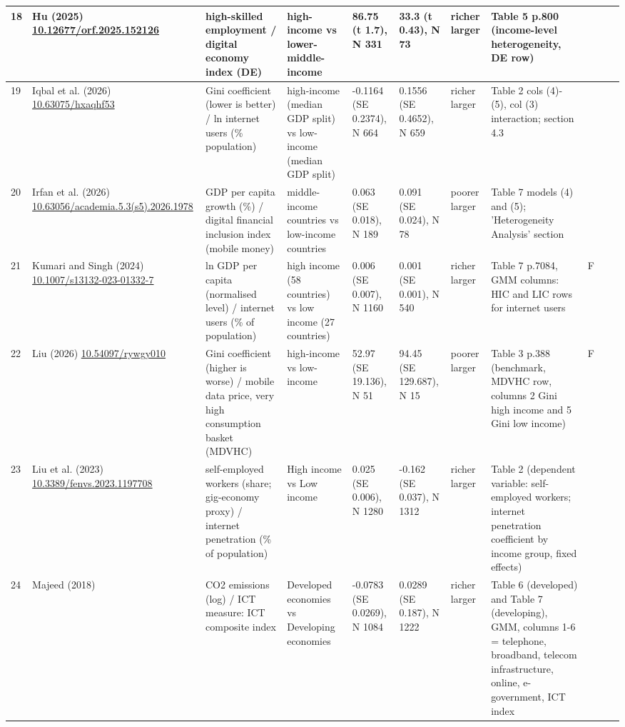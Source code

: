 \documentclass[10pt,a4paper]{article}
\begin{document}
\begin{longtable}{@{}p{0.4cm}p{2.4cm}p{2.6cm}p{3.0cm}p{2.6cm}p{2.6cm}p{1.5cm}p{5.6cm}p{0.3cm}p{1.0cm}p{1.6cm}@{}}
18 & Hu (2025) \newline \url{10.12677/orf.2025.152126} & high-skilled employment / digital economy index (DE) & high-income vs lower-middle-income & 86.75 (t 1.7), N 331 & 33.3 (t 0.43), N 73 & richer larger & Table 5 p.800 (income-level heterogeneity, DE row) &  &  &  \\ \midrule
19 & Iqbal et al. (2026) \newline \url{10.63075/hxaqhf53} & Gini coefficient (lower is better) / ln internet users (\% population) & high-income (median GDP split) vs low-income (median GDP split) & -0.1164 (SE 0.2374), N 664 & 0.1556 (SE 0.4652), N 659 & richer larger & Table 2 cols (4)-(5), col (3) interaction; section 4.3 &  &  &  \\ \midrule
20 & Irfan et al. (2026) \newline \url{10.63056/academia.5.3(s5).2026.1978} & GDP per capita growth (\%) / digital financial inclusion index (mobile money) & middle-income countries vs low-income countries & 0.063 (SE 0.018), N 189 & 0.091 (SE 0.024), N 78 & poorer larger & Table 7 models (4) and (5); 'Heterogeneity Analysis' section &  &  &  \\ \midrule
21 & Kumari and Singh (2024) \newline \url{10.1007/s13132-023-01332-7} & ln GDP per capita (normalised level) / internet users (\% of population) & high income (58 countries) vs low income (27 countries) & 0.006 (SE 0.007), N 1160 & 0.001 (SE 0.001), N 540 & richer larger & Table 7 p.7084, GMM columns: HIC and LIC rows for internet users & F &  &  \\ \midrule
22 & Liu (2026) \newline \url{10.54097/rywgy010} & Gini coefficient (higher is worse) / mobile data price, very high consumption basket (MDVHC) & high-income vs low-income & 52.97 (SE 19.136), N 51 & 94.45 (SE 129.687), N 15 & poorer larger & Table 3 p.388 (benchmark, MDVHC row, columns 2 Gini high income and 5 Gini low income) & F &  &  \\ \midrule
23 & Liu et al. (2023) \newline \url{10.3389/fenvs.2023.1197708} & self-employed workers (share; gig-economy proxy) / internet penetration (\% of population) & High income vs Low income & 0.025 (SE 0.006), N 1280 & -0.162 (SE 0.037), N 1312 & richer larger & Table 2 (dependent variable: self-employed workers; internet penetration coefficient by income group, fixed effects) &  &  &  \\ \midrule
24 & Majeed (2018) & CO2 emissions (log) / ICT measure: ICT composite index & Developed economies vs Developing economies & -0.0783 (SE 0.0269), N 1084 & 0.0289 (SE 0.187), N 1222 & richer larger & Table 6 (developed) and Table 7 (developing), GMM, columns 1-6 = telephone, broadband, telecom infrastructure, online, e-government, ICT index &  &  &  \\ \midrule

\end{longtable}
\end{document}
